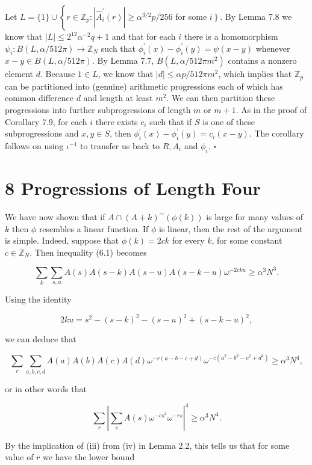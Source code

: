 \documentclass[10pt]{article}
\begin{document}
Let $L=\{1\} \cup\left\{r \in \mathbb{Z}_{p}:\left|\hat{A}_{i}^{\prime}(r)\right| \geqslant \alpha^{3 / 2} p / 256\right.$ for some $\left.i\right\}$. By Lemma 7.8 we know that $|L| \leqslant 2^{12} \alpha^{-2} q+1$ and that for each $i$ there is a homomorphism $\psi_{i}: B(L, \alpha / 512 \pi) \rightarrow \mathbb{Z}_{N}$ such that $\phi_{i}^{\prime}(x)-\phi_{i}^{\prime}(y)=\psi(x-y)$ whenever $x-y \in B(L, \alpha / 512 \pi)$. By Lemma 7.7, $B\left(L, \alpha / 512 \pi m^{2}\right)$ contains a nonzero element $d$. Because $1 \in L$, we know that $|d| \leqslant \alpha p / 512 \pi m^{2}$, which implies that $\mathbb{Z}_{p}$ can be partitioned into (genuine) arithmetic progressions each of which has common difference $d$ and length at least $m^{2}$. We can then partition these progressions into further subprogressions of length $m$ or $m+1$. As in the proof of Corollary 7.9, for each $i$ there exists $c_{i}$ such that if $S$ is one of these subprogressions and $x, y \in S$, then $\phi_{i}^{\prime}(x)-\phi_{i}^{\prime}(y)=c_{i}(x-y)$. The corollary follows on using $\iota^{-1}$ to transfer us back to $R, A_{i}$ and $\phi_{i}$. \(\square\)

\section*{8 Progressions of Length Four}
We have now shown that if $A \cap(A+k)^{\sim}(\phi(k))$ is large for many values of $k$ then $\phi$ resembles a linear function. If $\phi$ is linear, then the rest of the argument is simple. Indeed, suppose that $\phi(k)=2 c k$ for every $k$, for some constant $c \in \mathbb{Z}_{N}$. Then inequality (6.1) becomes

$$
\sum_{k} \sum_{s, u} A(s) A(s-k) A(s-u) A(s-k-u) \omega^{-2 c k u} \geqslant \alpha^{3} N^{3} .
$$

Using the identity

$$
2 k u=s^{2}-(s-k)^{2}-(s-u)^{2}+(s-k-u)^{2},
$$

we can deduce that

$$
\sum_{r} \sum_{a, b, c, d} A(a) A(b) A(c) A(d) \omega^{-r(a-b-c+d)} \omega^{-c\left(a^{2}-b^{2}-c^{2}+d^{2}\right)} \geqslant \alpha^{3} N^{4},
$$

or in other words that

$$
\sum_{r}\left|\sum_{s} A(s) \omega^{-c s^{2}} \omega^{-r s}\right|^{4} \geqslant \alpha^{3} N^{4} .
$$

By the implication of (iii) from (iv) in Lemma 2.2, this tells us that for some value of $r$ we have the lower bound
\end{document}
